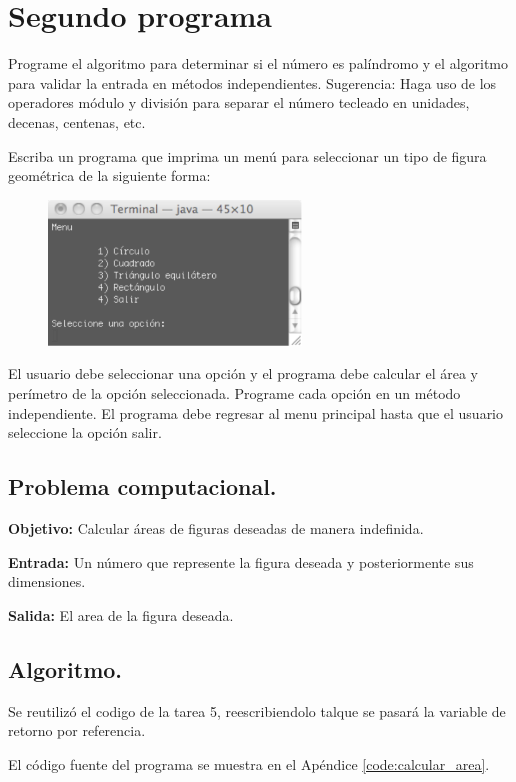 \documentclass[12pt,letterpaper]{article}
\begin{document}
\section{Segundo programa}

Programe el algoritmo para determinar si el n\'umero es pal\'indromo y el algoritmo para validar la entrada en m\'etodos independientes.
Sugerencia: Haga uso de los operadores m\'odulo y divisi\'on para separar el n\'umero tecleado en unidades, decenas, centenas, etc.

Escriba un programa que imprima un men\'u para seleccionar un tipo de figura geom\'etrica de la siguiente forma:
\begin{figure}[ht!]
  \centering
  \includegraphics[width=0.6\textwidth]{figures/captura}
\end{figure}

El usuario debe seleccionar una opci\'on y el programa debe calcular el \'area y per\'imetro de la opci\'on seleccionada. Programe cada opci\'on en un m\'etodo independiente. El programa debe regresar al menu principal hasta que el usuario seleccione la opci\'on salir.

\subsection{Problema computacional.}
\textbf{Objetivo:} Calcular \'areas de figuras deseadas de manera indefinida.

\textbf{Entrada:} Un n\'umero que represente la figura deseada y posteriormente sus dimensiones.

\textbf{Salida:} El area de la figura deseada.

\subsection{Algoritmo.}
Se reutiliz\'o el codigo de la tarea 5, reescribiendolo talque se pasar\'a la variable de retorno por referencia.

El c\'odigo fuente del programa se muestra en el Apéndice \ref{code:calcular_area}.
\end{document}
